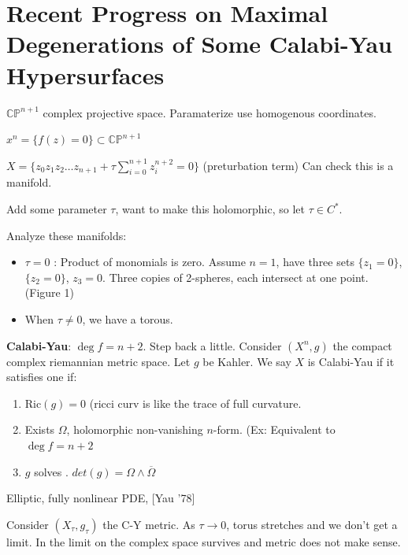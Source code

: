 
\section{Recent Progress on Maximal Degenerations of Some Calabi-Yau Hypersurfaces}

$\mathbb{C} \mathbb{P}^{n+1}$ complex projective space. Paramaterize use homogenous coordinates.

$x^n = \{f(z) = 0\}  \subset \mathbb{C}\mathbb{P}^{n+1}$ 

\begin{example}
	$X =\{z_0 z_1 z_2 \ldots z_{n+1} + \tau\sum_{i=0}^{n+1} z_i^{n+2} = 0\} $ (preturbation term) Can check this is a manifold.
\end{example}

Add some parameter $\tau$, want to make this holomorphic, so let $\tau \in C^*$.

Analyze these manifolds:

\begin{itemize}
	\item $\tau = 0$ : Product of monomials is zero. Assume $n = 1$, have three sets $\{z_1 = 0\} $, $\{z_2 = 0\} $, $z_3 = 0$. Three copies of 2-spheres, each intersect at one point. (Figure 1) 
	\item When $\tau\neq 0$, we have a torous.
\end{itemize}

\textbf{Calabi-Yau}: $\operatorname{deg} f = n + 2$. Step back a little. Consider $(X^n, g)$ the compact complex riemannian metric space. Let $g$ be Kahler. We say $X$ is Calabi-Yau if it satisfies  one if:
\begin{enumerate}
	\item $\text{Ric}(g) = 0$ (ricci curv is like the trace of full curvature.
	\item Exists $\Omega$, holomorphic non-vanishing $n$-form. (Ex: Equivalent to $\operatorname{deg}  f = n + 2$
	\item $g$ solves . $det(g) = \Omega \land \overline{\Omega}$
\end{enumerate}
Elliptic, fully nonlinear PDE, [Yau '78]

\begin{example}
	Consider $(X_\tau, g_\tau)$ the C-Y metric. As $\tau\to 0$, torus stretches and we don't get a limit. In the limit on the complex space survives and metric does not make sense.
\end{example}

